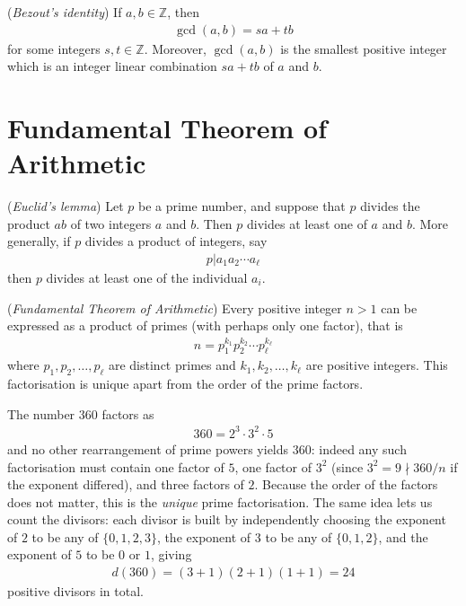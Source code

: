 \documentclass[a4paper, 12pt]{book} %
\begin{document}
\begin{theorem}
    (\emph{Bezout's identity}) If $a, b \in \mathbb{Z}$, then
    \begin{align}
        \gcd(a, b) = sa + tb
    \end{align} 
    for some integers $s, t \in \mathbb{Z}$. Moreover, $\gcd(a, b)$ is the smallest positive integer which is an integer linear combination $sa + tb$ of $a$ and $b$.
\end{theorem}


\section{Fundamental Theorem of Arithmetic}


\begin{lemma}
    (\emph{Euclid's lemma}) 
    Let $p$ be a prime number, and suppose that $p$ divides the product $ab$ of two integers $a$ and $b$. Then $p$ divides at least one of $a$ and $b$. More generally, if $p$ divides a product of integers, say
    \begin{align}
        p|a_1 a_2 \cdots a_\ell
    \end{align}
    then $p$ divides at least one of the individual $a_i$.
\end{lemma}
\begin{theorem}
    (\emph{Fundamental Theorem of Arithmetic}) Every positive integer $n > 1$ can be expressed as a product of primes (with perhaps only one factor), that is
    \begin{align}
        n = p_1^{k_1} p_2^{k_2} \cdots p_{\ell}^{k_\ell}
    \end{align}
    where $p_1, p_2, \ldots, p_\ell$ are distinct primes and $k_1, k_2, \ldots, k_\ell$ are positive integers. This factorisation is unique apart from the order of the prime factors.
\end{theorem}

\begin{example}
    The number $360$ factors as
    \begin{align}
        360 = 2^3 \cdot 3^2 \cdot 5
    \end{align}
    and no other rearrangement of prime powers yields $360$: indeed any such factorisation must contain one factor of $5$, one factor of $3^2$ (since $3^2 = 9 \nmid 360/n$ if the exponent differed), and three factors of $2$. Because the order of the factors does not matter, this is the \emph{unique} prime factorisation. The same idea lets us count the divisors: each divisor is built by independently choosing the exponent of $2$ to be any of $\{0,1,2,3\}$, the exponent of $3$ to be any of $\{0,1,2\}$, and the exponent of $5$ to be $0$ or $1$, giving
    \begin{align}
        d(360) = (3+1)(2+1)(1+1) = 24
    \end{align}
    positive divisors in total.
\end{example}
\end{document}
